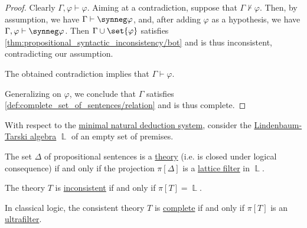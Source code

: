 \begin{proof}
  Clearly \( \Gamma, \varphi \vdash \varphi \). Aiming at a contradiction, suppose that \( \Gamma \nvdash \varphi \). Then, by assumption, we have \( \Gamma \vdash \synneg \varphi \), and, after adding \( \varphi \) as a hypothesis, we have \( \Gamma, \varphi \vdash \synneg \varphi \). Then \( \Gamma \cup \set{ \varphi } \) satisfies \cref{thm:propositional_syntactic_inconsistency/bot} and is thus inconsistent, contradicting our assumption.

  The obtained contradiction implies that \( \Gamma \vdash \varphi \).

  Generalizing on \( \varphi \), we conclude that \( \Gamma \) satisfies \cref{def:complete_set_of_sentences/relation} and is thus complete.
\end{proof}

\begin{proposition}\label{thm:lindenbaum_tarski_theories}
  With respect to the \hyperref[def:propositional_natural_deduction]{minimal natural deduction system}, consider the \hyperref[def:lindenbaum_tarski_algebra]{Lindenbaum-Tarski algebra} \( \BbbL \) of an empty set of premises.

  \begin{thmenum}
     The set \( \Delta \) of propositional sentences is a \hyperref[def:propositional_theory]{theory} (i.e. is closed under logical consequence) if and only if the projection \( \pi[\Delta] \) is a \hyperref[def:lattice_ideal]{lattice filter} in \( \BbbL \).

     The theory \( T \) is \hyperref[def:propositional_theory/consistent]{inconsistent} if and only if \( \pi[T] = \BbbL \).

     In classical logic, the consistent theory \( T \) is \hyperref[def:complete_set_of_sentences]{complete} if and only if \( \pi[T] \) is an \hyperref[def:ultrafilter]{ultrafilter}.
  \end{thmenum}
\end{proposition}
